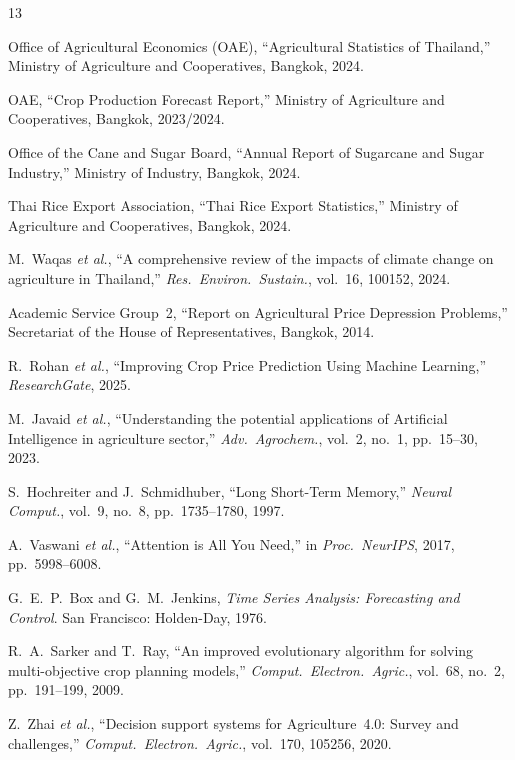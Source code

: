 \documentclass[conference]{IEEEtran}
\begin{document}
\balance
\begin{thebibliography}{13}

Office of Agricultural Economics (OAE), ``Agricultural Statistics of Thailand,'' Ministry of Agriculture and Cooperatives, Bangkok, 2024.

OAE, ``Crop Production Forecast Report,'' Ministry of Agriculture and Cooperatives, Bangkok, 2023/2024.

Office of the Cane and Sugar Board, ``Annual Report of Sugarcane and Sugar Industry,'' Ministry of Industry, Bangkok, 2024.

Thai Rice Export Association, ``Thai Rice Export Statistics,'' Ministry of Agriculture and Cooperatives, Bangkok, 2024.

M.~Waqas \textit{et al.}, ``A comprehensive review of the impacts of climate change on agriculture in Thailand,'' \textit{Res.\ Environ.\ Sustain.}, vol.~16, 100152, 2024.

Academic Service Group~2, ``Report on Agricultural Price Depression Problems,'' Secretariat of the House of Representatives, Bangkok, 2014.

R.~Rohan \textit{et al.}, ``Improving Crop Price Prediction Using Machine Learning,'' \textit{ResearchGate}, 2025.

M.~Javaid \textit{et al.}, ``Understanding the potential applications of Artificial Intelligence in agriculture sector,'' \textit{Adv.\ Agrochem.}, vol.~2, no.~1, pp.~15--30, 2023.

S.~Hochreiter and J.~Schmidhuber, ``Long Short-Term Memory,'' \textit{Neural Comput.}, vol.~9, no.~8, pp.~1735--1780, 1997.

A.~Vaswani \textit{et al.}, ``Attention is All You Need,'' in \textit{Proc.\ NeurIPS}, 2017, pp.~5998--6008.

G.~E.~P.~Box and G.~M.~Jenkins, \textit{Time Series Analysis: Forecasting and Control}. San Francisco: Holden-Day, 1976.

R.~A.~Sarker and T.~Ray, ``An improved evolutionary algorithm for solving multi-objective crop planning models,'' \textit{Comput.\ Electron.\ Agric.}, vol.~68, no.~2, pp.~191--199, 2009.

Z.~Zhai \textit{et al.}, ``Decision support systems for Agriculture~4.0: Survey and challenges,'' \textit{Comput.\ Electron.\ Agric.}, vol.~170, 105256, 2020.

\end{thebibliography}
\end{document}
